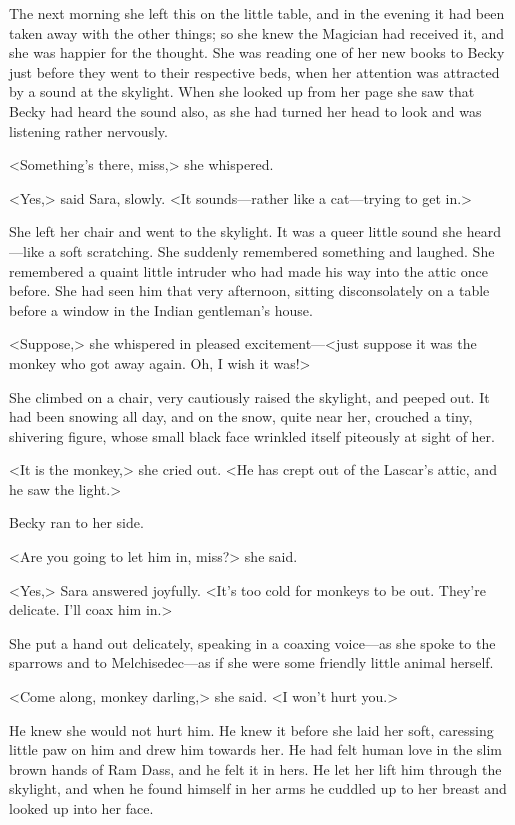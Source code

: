 The next morning she left this on the little table, and in the evening it had been taken away with the other things; so she knew the Magician had received it, and she was happier for the thought. She was reading one of her new books to Becky just before they went to their respective beds, when her attention was attracted by a sound at the skylight. When she looked up from her page she saw that Becky had heard the sound also, as she had turned her head to look and was listening rather nervously.

<Something's there, miss,> she whispered.

<Yes,> said Sara, slowly. <It sounds—rather like a cat—trying to get in.>

She left her chair and went to the skylight. It was a queer little sound she heard—like a soft scratching. She suddenly remembered something and laughed. She remembered a quaint little intruder who had made his way into the attic once before. She had seen him that very afternoon, sitting disconsolately on a table before a window in the Indian gentleman's house.

<Suppose,> she whispered in pleased excitement—<just suppose it was the monkey who got away again. Oh, I wish it was!>

She climbed on a chair, very cautiously raised the skylight, and peeped out. It had been snowing all day, and on the snow, quite near her, crouched a tiny, shivering figure, whose small black face wrinkled itself piteously at sight of her.

<It is the monkey,> she cried out. <He has crept out of the Lascar's attic, and he saw the light.>

Becky ran to her side.

<Are you going to let him in, miss?> she said.

<Yes,> Sara answered joyfully. <It's too cold for monkeys to be out. They're delicate. I'll coax him in.>

She put a hand out delicately, speaking in a coaxing voice—as she spoke to the sparrows and to Melchisedec—as if she were some friendly little animal herself.

<Come along, monkey darling,> she said. <I won't hurt you.>

He knew she would not hurt him. He knew it before she laid her soft, caressing little paw on him and drew him towards her. He had felt human love in the slim brown hands of Ram Dass, and he felt it in hers. He let her lift him through the skylight, and when he found himself in her arms he cuddled up to her breast and looked up into her face.

